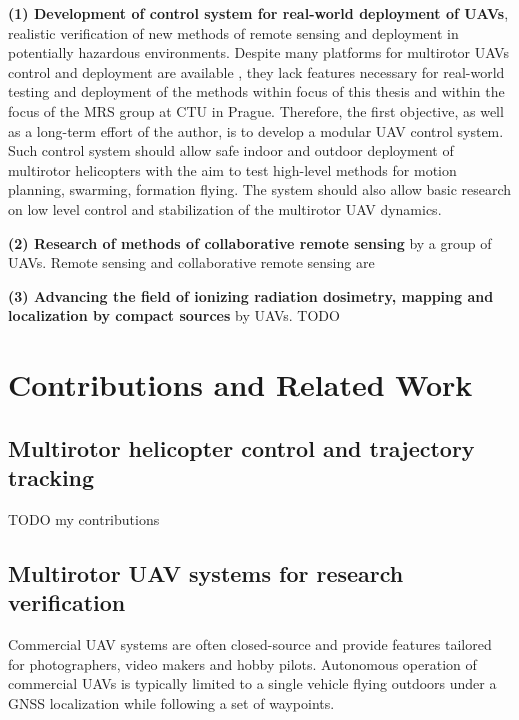 \documentclass[a4paper,11pt,titlepage,twoside]{book}
\newcommand{\todo}[1]{{\color{red} TODO {#1}}}
\newcommand{\chapternoclear}[1]{
  \begingroup
  \let\cleardoublepage\clearpage
  \chapter{#1}
  \endgroup
}
\begin{document}
\textbf{(1) Development of control system for real-world deployment of \acp{UAV}}, realistic verification of new methods of remote sensing and deployment in potentially hazardous environments.
Despite many platforms for multirotor \acp{UAV} control and deployment are available \cite{sanchez2016aerostack, xiao2020xtdrone, furrer2016rotors, schmittle2018openuav, abeywardena2015design, mellado2013mavwork}, they lack features necessary for real-world testing and deployment of the methods within focus of this thesis and within the focus of the \acl{MRS} group at \ac{CTU} in Prague.
Therefore, the first objective, as well as a long-term effort of the author, is to develop a modular \ac{UAV} control system.
Such control system should allow safe indoor and outdoor deployment of multirotor helicopters with the aim to test high-level methods for motion planning, swarming, formation flying.
The system should also allow basic research on low level control and stabilization of the multirotor \ac{UAV} dynamics.

\textbf{(2) Research of methods of collaborative remote sensing} by a group of \aclp{UAV}.
Remote sensing and collaborative remote sensing are

\textbf{(3) Advancing the field of ionizing radiation dosimetry, mapping and localization by compact sources} by \aclp{UAV}.
\todo{}




\chapternoclear{Contributions and Related Work}

\section{Multirotor helicopter control and trajectory tracking}

\todo{my contributions}
\cite{baca2016embedded} %
\cite{baca2018model} %
\cite{baca2020mrs} %

\section{Multirotor UAV systems for research verification}

Commercial \ac{UAV} systems are often closed-source and provide features tailored for photographers, video makers and hobby pilots.
Autonomous operation of commercial \acp{UAV} is typically limited to a single vehicle flying outdoors under a \ac{GNSS} localization while following a set of waypoints.
\end{document}
